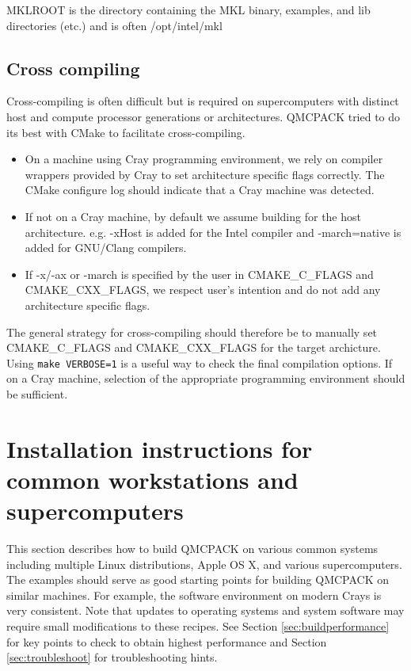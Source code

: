 MKLROOT is the directory containing the MKL binary, examples, and lib
directories (etc.) and is often /opt/intel/mkl 

\subsection{Cross compiling}
Cross-compiling is often difficult but is required on supercomputers
with distinct host and compute processor generations or architectures.
QMCPACK tried to do its best with CMake to facilitate cross-compiling.

\begin{itemize}
  \item On a machine using Cray programming environment, we rely on
      compiler wrappers provided by Cray to set architecture specific
      flags correctly. The CMake configure log should indicate that a
      Cray machine was detected.
  \item If not on a Cray machine, by default we assume building for
    the host architecture. e.g. -xHost is added for the Intel compiler
    and -march=native is added for GNU/Clang compilers.
  \item If -x/-ax or -march is specified by the user in CMAKE\_C\_FLAGS and CMAKE\_CXX\_FLAGS,
    we respect user's intention and do not add any architecture specific flags.
\end{itemize}

The general strategy for cross-compiling should therefore be to
manually set CMAKE\_C\_FLAGS and CMAKE\_CXX\_FLAGS for the target
archicture. Using \texttt{make VERBOSE=1} is a useful way to check the
final compilation options.  If on a Cray machine, selection of the
appropriate programming environment should be sufficient.

\section{Installation instructions for common workstations and
  supercomputers}
\label{sec:installexamples}

This section describes how to build QMCPACK on various common systems
including multiple Linux distributions, Apple OS X, and various
supercomputers. The examples should serve as good starting points for
building QMCPACK on similar machines. For example, the software
environment on modern Crays is very consistent. Note that updates to
operating systems and system software may require small modifications
to these recipes. See Section \ref{sec:buildperformance} for key
points to check to obtain highest performance and
Section \ref{sec:troubleshoot} for troubleshooting hints.

